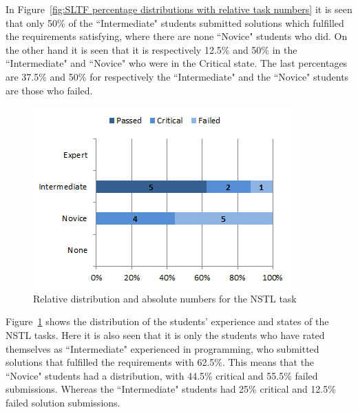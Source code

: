 \documentclass{sig-alternate-05-2015}
\begin{document}
In Figure~\ref{fig:SLTF percentage distributions with relative task numbers} it is seen that only 50\% of the ``Inter\-mediate" students submitted solutions which fulfilled the requirements satisfying, where there are none ``Novice" students who did. On the other hand it is seen that it is respectively 12.5\% and 50\% in the ``Intermediate" and ``Novice" who were in the Critical state. The last percentages are 37.5\% and 50\% for respectively the ``Intermediate" and the ``Novice" students are those who failed.

\begin{figure}[!ht]
	\centering
	\includegraphics[width=1\linewidth]{img08}
	\caption{Relative distribution and absolute numbers for the NSTL task}
	\label{fig:NSTL percentage distributions with relative task numbers}
\end{figure}

Figure~\ref{fig:NSTL percentage distributions with relative task numbers} shows the distribution of the students' ex\-perience and states of the NSTL tasks. Here it is also seen that it is only the students who have rated themselves as ``Inter\-mediate" experienced in programming, who submitted solutions that fulfilled the requirements with 62.5\%. This means that the ``Novice" students had a distribution, with 44.5\% critical and 55.5\% failed submissions. Whereas the ``Inter\-mediate" students had 25\% critical and 12.5\% failed solution submissions.
\end{document}
